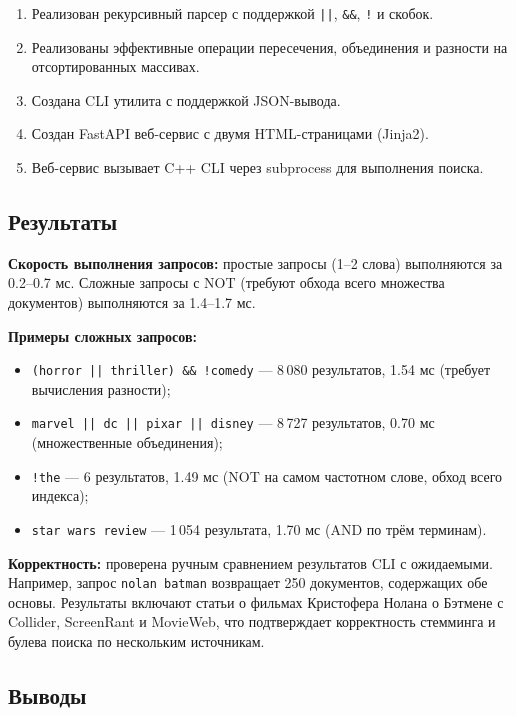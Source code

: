 \documentclass[a4paper,12pt]{article}
\begin{document}
\begin{enumerate}
    \item Реализован рекурсивный парсер с поддержкой \texttt{||}, \texttt{\&\&}, \texttt{!} и скобок.
    \item Реализованы эффективные операции пересечения, объединения и разности на отсортированных массивах.
    \item Создана CLI утилита с поддержкой JSON-вывода.
    \item Создан FastAPI веб-сервис с двумя HTML-страницами (Jinja2).
    \item Веб-сервис вызывает C++ CLI через subprocess для выполнения поиска.
\end{enumerate}

\subsection{Результаты}

\textbf{Скорость выполнения запросов:} простые запросы (1--2 слова) выполняются за 0.2--0.7 мс. Сложные запросы с NOT (требуют обхода всего множества документов) выполняются за 1.4--1.7 мс.

\textbf{Примеры сложных запросов:}
\begin{itemize}
    \item \texttt{(horror || thriller) \&\& !comedy} --- 8\,080 результатов, 1.54 мс (требует вычисления разности);
    \item \texttt{marvel || dc || pixar || disney} --- 8\,727 результатов, 0.70 мс (множественные объединения);
    \item \texttt{!the} --- 6 результатов, 1.49 мс (NOT на самом частотном слове, обход всего индекса);
    \item \texttt{star wars review} --- 1\,054 результата, 1.70 мс (AND по трём терминам).
\end{itemize}

\textbf{Корректность:} проверена ручным сравнением результатов CLI с ожидаемыми. Например, запрос \texttt{nolan batman} возвращает 250 документов, содержащих обе основы. Результаты включают статьи о фильмах Кристофера Нолана о Бэтмене с Collider, ScreenRant и MovieWeb, что подтверждает корректность стемминга и булева поиска по нескольким источникам.

\subsection{Выводы}
\end{document}
